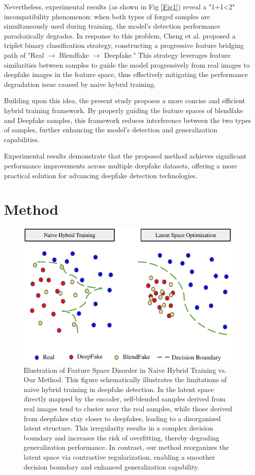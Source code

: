 \documentclass[final,5p,times]{elsarticle}
\begin{document}
Nevertheless, experimental results (as shown in Fig \ref{Fig1}) reveal a "1+1<2" incompatibility phenomenon: when both types of forged samples are simultaneously used during training, the model's detection performance paradoxically degrades. In response to this problem, Cheng et al. \cite{30} proposed a triplet binary classification strategy, constructing a progressive feature bridging path of "Real $\rightarrow$ Blendfake $\rightarrow$ Deepfake." This strategy leverages feature similarities between samples to guide the model progressively from real images to deepfake images in the feature space, thus effectively mitigating the performance degradation issue caused by naive hybrid training.

Building upon this idea, the present study proposes a more concise and efficient hybrid training framework. By properly guiding the feature spaces of blendfake and Deepfake samples, this framework reduces interference between the two types of samples, further enhancing the model's detection and generalization capabilities.

Experimental results demonstrate that the proposed method achieves significant performance improvements across multiple deepfake datasets, offering a more practical solution for advancing deepfake detection technologies.

\section{Method} \label{m}

\begin{figure}[htb]
\centering
\includegraphics[width=0.5\linewidth]{images/Fig2.pdf}
\caption{Illustration of Feature Space Disorder in Naive Hybrid Training vs. Our Method. This figure schematically illustrates the limitations of naive hybrid training in deepfake detection. In the latent space directly mapped by the encoder, self-blended samples derived from real images tend to cluster near the real samples, while those derived from deepfakes stay closer to deepfakes, leading to a disorganized latent structure. This irregularity results in a complex decision boundary and increases the risk of overfitting, thereby degrading generalization performance. In contrast, our method reorganizes the latent space via contrastive regularization, enabling a smoother decision boundary and enhanced generalization capability.} 
\label{Fig2}
\end{figure}
\end{document}
